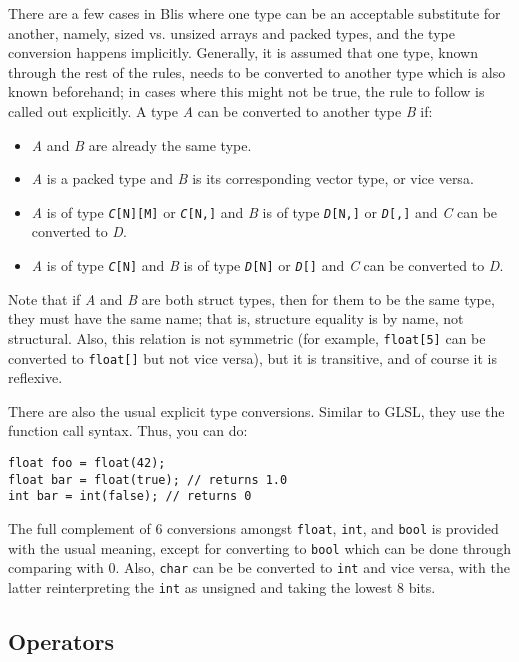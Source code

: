 \documentclass[11pt]{article}
\newcommand{\code}[1]{\texttt{#1}}
\begin{document}
There are a few cases in Blis where one type can be an acceptable substitute for another, namely, sized vs. unsized arrays and packed types, and the type conversion happens implicitly. Generally, it is assumed that one type, known through the rest of the rules, needs to be converted to another type which is also known beforehand; in cases where this might not be true, the rule to follow is called out explicitly. A type \textit{A} can be converted to another type \textit{B} if:

\begin{itemize}
	\item \textit{A} and \textit{B} are already the same type.
	\item \textit{A} is a packed type and \textit{B} is its corresponding vector type, or vice versa.
	\item \textit{A} is of type \code{\textit{C}[N][M]} or \code{\textit{C}[N,]} and \textit{B} is of type \code{\textit{D}[N,]} or \code{\textit{D}[,]} and \textit{C} can be converted to \textit{D}.
	\item \textit{A} is of type \code{\textit{C}[N]} and \textit{B} is of type \code{\textit{D}[N]} or \code{\textit{D}[]} and \textit{C} can be converted to \textit{D}.
\end{itemize}

Note that if \textit{A} and \textit{B} are both struct types, then for them to be the same type, they must have the same name; that is, structure  equality is by name, not structural. Also, this relation is not symmetric (for example, \code{float[5]} can be converted to \code{float[]} but not vice versa), but it is transitive, and of course it is reflexive.

There are also the usual explicit type conversions. Similar to GLSL, they use the function call syntax. Thus, you can do:

\begin{lstlisting}
float foo = float(42);
float bar = float(true); // returns 1.0
int bar = int(false); // returns 0
\end{lstlisting}

The full complement of 6 conversions amongst \code{float}, \code{int}, and \code{bool} is provided with the usual meaning, except for converting to \code{bool} which can be done through comparing with 0. Also, \code{char} can be be converted to \code{int} and vice versa, with the latter reinterpreting the \code{int} as unsigned and taking the lowest 8 bits.

\subsection{Operators} \label{operators}
\end{document}
